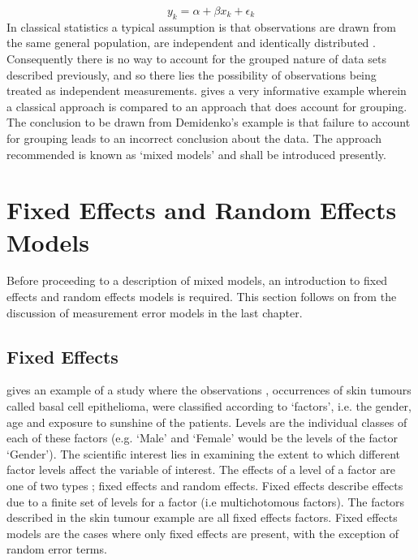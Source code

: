 \documentclass[12pt, a4paper]{report}
\theoremstyle{plain}
\theoremstyle{definition}
\theoremstyle{remark}
\begin{document}
\begin{equation}
y_{k} = \alpha + \beta x_{k}+ \epsilon_{k}
\end{equation}
In classical statistics a typical assumption is that observations
are drawn from the same general population, are independent and
identically distributed \citep{Demi}. Consequently there is no way
to account for the grouped nature of data sets described
previously, and so there lies the possibility of observations
being treated as independent measurements. \citet[pg.3]{Demi}
gives a very informative example wherein a classical approach is
compared to an approach that does account for grouping. The
conclusion to be drawn from Demidenko's example is that failure to
account for grouping leads to an incorrect conclusion about the
data. The approach recommended is known as `mixed models' and
shall be introduced presently.



\section{Fixed Effects and Random Effects Models}
Before proceeding to a description of mixed models, an
introduction to fixed effects and random effects models is
required. This section follows on from the discussion of
measurement error models in the last chapter.

\subsection{Fixed Effects}
\citet{McCullSearle} gives an example of a study where the
observations , occurrences of skin tumours called basal cell
epithelioma, were classified according to `factors', i.e. the
gender, age and exposure to sunshine of the patients. Levels are
the individual classes of each of these factors (e.g. `Male' and
`Female' would be the levels of the factor `Gender'). The
scientific interest lies in examining the extent to which
different factor levels affect the variable of interest. The
effects of a level of a factor are one of two types ; fixed
effects and random effects. Fixed effects describe effects due to
a finite set of levels for a factor (i.e multichotomous factors).
The factors described in the skin tumour example are all fixed
effects factors. Fixed effects models are the cases where only
fixed effects are present, with the exception of random error
terms.
\end{document}
